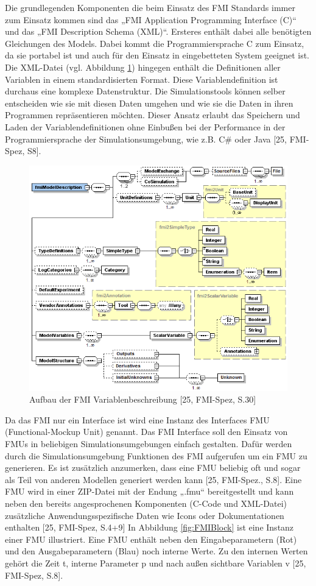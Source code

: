 Die grundlegenden Komponenten die beim Einsatz des FMI Standards immer zum Einsatz kommen sind das „FMI Application Programming Interface (C)“ und das „FMI Description Schema (XML)“. Ersteres enthält dabei alle benötigten Gleichungen des Models. Dabei kommt die Programmiersprache C zum Einsatz, da sie portabel ist und auch für den Einsatz in eingebetteten System geeignet ist. Die XML-Datei (vgl. Abbildung \ref{fig:FMIOverview}) hingegen enthält die Definitionen aller Variablen in einem standardisierten Format. Diese Variablendefinition ist durchaus eine komplexe Datenstruktur. Die Simulationstools können selber entscheiden wie sie mit diesen Daten umgehen und wie sie die Daten in ihren Programmen repräsentieren möchten. Dieser Ansatz erlaubt das Speichern und Laden der Variablendefinitionen ohne Einbußen bei der Performance in der Programmiersprache der Simulationsumgebung, wie z.B. C\# oder Java [25, FMI-Spez, S8].
\begin{figure}[h]
	\centering
	\includegraphics[width=0.7\linewidth]{Bilder/A20_FMIOverview}
	\caption{Aufbau der FMI Variablenbeschreibung [25, FMI-Spez, S.30]}
	\label{fig:FMIOverview}
\end{figure}
\newline
Da das FMI nur ein Interface ist wird eine Instanz des Interfaces FMU (Functional-Mockup Unit) genannt. Das FMI Interface soll den Einsatz von FMUs in beliebigen Simulationsumgebungen einfach gestalten. Dafür werden durch die Simulationsumgebung Funktionen des FMI aufgerufen um ein FMU zu generieren. Es ist zusätzlich anzumerken, dass eine FMU beliebig oft und sogar als Teil von anderen Modellen generiert werden kann [25, FMI-Spez., S.8]. Eine FMU wird in einer ZIP-Datei mit der Endung „.fmu“ bereitgestellt und kann neben den bereits angesprochenen Komponenten (C-Code und XML-Datei) zusätzliche Anwendungsspezifische Daten wie Icons oder Dokumentationen enthalten [25, FMI-Spez, S.4+9] In Abbildung \ref{fig:FMIBlock} ist eine Instanz einer FMU illustriert. Eine FMU enthält neben den Eingabeparametern (Rot) und den Ausgabeparametern (Blau) noch interne Werte. Zu den internen Werten gehört die Zeit t, interne Parameter p und nach außen sichtbare Variablen v [25, FMI-Spez, S.8].
